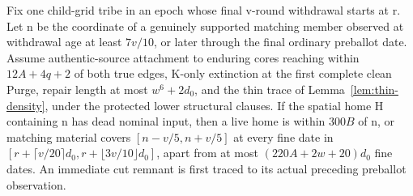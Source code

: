 \begin{lemma}\label{lem:remote}
Fix one child-grid tribe in an epoch whose final v-round withdrawal starts at r. Let n be the coordinate of a genuinely supported matching member observed at withdrawal age at least \(7v/10\), or later through the final ordinary preballot date. Assume authentic-source attachment to enduring cores reaching within \(12A+4q+2\) of both true edges, K-only extinction at the first complete clean Purge, repair length at most \(w^6+2d_0\), and the thin trace of Lemma~\ref{lem:thin-density}, under the protected lower structural clauses. If the spatial home H containing n has dead nominal input, then a live home is within \(300B\) of n, or matching material covers \([n-v/5,n+v/5]\) at every fine date in \([r+\lceil v/20\rceil d_0,r+\lfloor3v/10\rfloor d_0]\), apart from at most \((220A+2w+20)d_0\) fine dates. An immediate cut remnant is first traced to its actual preceding preballot observation.
\end{lemma}
